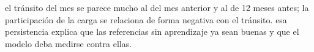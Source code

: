 {el tránsito del mes se parece mucho al del mes anterior y al de 12 meses antes; la participación de la carga se relaciona de forma negativa con el tránsito.}
{esa persistencia explica que las referencias sin aprendizaje ya sean buenas y que el modelo deba medirse contra ellas.}
